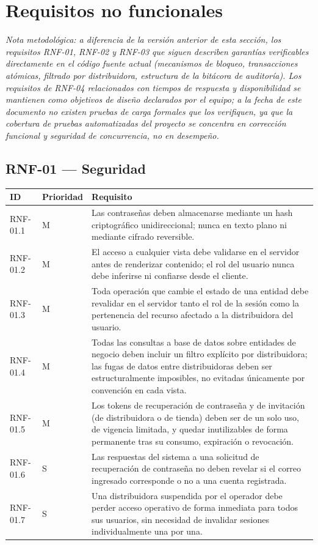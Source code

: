 \documentclass[12pt,a4paper]{report}
\begin{document}
\section{Requisitos no funcionales}

\textit{Nota metodológica: a diferencia de la versión anterior de esta sección, los requisitos RNF-01, RNF-02 y RNF-03 que siguen describen garantías verificables directamente en el código fuente actual (mecanismos de bloqueo, transacciones atómicas, filtrado por distribuidora, estructura de la bitácora de auditoría). Los requisitos de RNF-04 relacionados con tiempos de respuesta y disponibilidad se mantienen como objetivos de diseño declarados por el equipo; a la fecha de este documento no existen pruebas de carga formales que los verifiquen, ya que la cobertura de pruebas automatizadas del proyecto se concentra en corrección funcional y seguridad de concurrencia, no en desempeño.}

\subsection{RNF-01 --- Seguridad}

\begin{longtable}{|p{2.5cm}|p{2cm}|p{9.5cm}|}
\hline
\textbf{ID} & \textbf{Prioridad} & \textbf{Requisito} \\ \hline
RNF-01.1 & M & Las contraseñas deben almacenarse mediante un hash criptográfico unidireccional; nunca en texto plano ni mediante cifrado reversible. \\ \hline
RNF-01.2 & M & El acceso a cualquier vista debe validarse en el servidor antes de renderizar contenido; el rol del usuario nunca debe inferirse ni confiarse desde el cliente. \\ \hline
RNF-01.3 & M & Toda operación que cambie el estado de una entidad debe revalidar en el servidor tanto el rol de la sesión como la pertenencia del recurso afectado a la distribuidora del usuario. \\ \hline
RNF-01.4 & M & Todas las consultas a base de datos sobre entidades de negocio deben incluir un filtro explícito por distribuidora; las fugas de datos entre distribuidoras deben ser estructuralmente imposibles, no evitadas únicamente por convención en cada vista. \\ \hline
RNF-01.5 & M & Los tokens de recuperación de contraseña y de invitación (de distribuidora o de tienda) deben ser de un solo uso, de vigencia limitada, y quedar inutilizables de forma permanente tras su consumo, expiración o revocación. \\ \hline
RNF-01.6 & S & Las respuestas del sistema a una solicitud de recuperación de contraseña no deben revelar si el correo ingresado corresponde o no a una cuenta registrada. \\ \hline
RNF-01.7 & S & Una distribuidora suspendida por el operador debe perder acceso operativo de forma inmediata para todos sus usuarios, sin necesidad de invalidar sesiones individualmente una por una. \\ \hline
\end{longtable}
\end{document}
